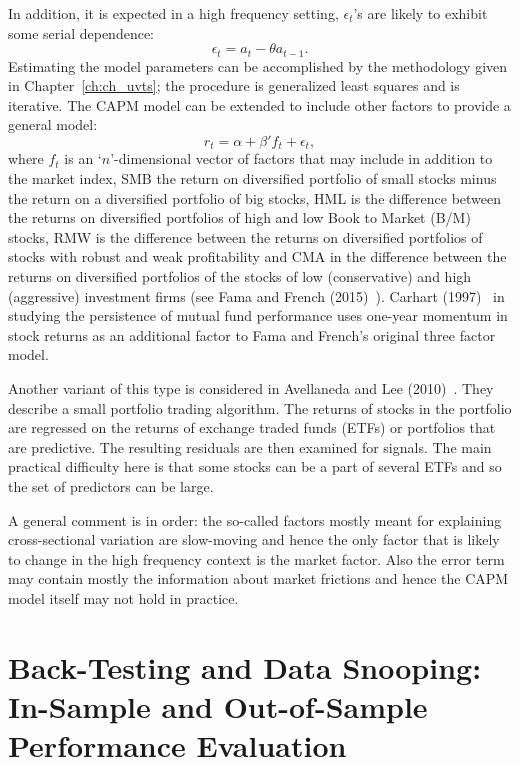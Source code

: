 In addition, it is expected in a high frequency setting, $\epsilon_t$'s are likely to exhibit some serial dependence:
	\begin{equation} \label{eqn:et}
	\epsilon_t = a_t - \theta a_{t-1}.
	\end{equation}
Estimating the model parameters can be accomplished by the methodology given in Chapter~\ref{ch:ch_uvts}; the procedure is generalized least squares and is iterative. The CAPM model can be extended to include other factors to provide a general model:
	\begin{equation} \label{eqn:rtalpha}
	r_t = \alpha + \beta'f_{t} + \epsilon_t,
	\end{equation}
where $f_t$ is an `$n$'-dimensional vector of factors that may include in addition to the market index, SMB the return on diversified portfolio of small stocks minus the return on a diversified portfolio of big stocks, HML is the difference between the returns on diversified portfolios of high and low Book to Market (B/M) stocks, RMW is the difference between the returns on diversified portfolios of stocks with robust and weak profitability and CMA in the difference between the returns on diversified portfolios of the stocks of low (conservative) and high (aggressive) investment firms (see Fama and French (2015)~\cite{fama2015}). Carhart (1997)~\cite{carhart1997persistence} in studying the persistence of mutual fund performance uses one-year momentum in stock returns as an additional factor to Fama and French's original three factor model.


Another variant of this type is considered in Avellaneda and Lee (2010)~\cite{avellee}. They describe a small portfolio trading algorithm. The returns of stocks in the portfolio are regressed on the returns of exchange traded funds (ETFs) or portfolios that are predictive. The resulting residuals are then examined for signals. The main practical difficulty here is that some stocks can be a part of several ETFs and so the set of predictors can be large. 


A general comment is in order: the so-called factors mostly meant for explaining cross-sectional variation are slow-moving and hence the only factor that is likely to change in the high frequency context is the market factor. Also the error term may contain mostly the information about market frictions and hence the CAPM model itself may not hold in practice.



\section{Back-Testing and Data Snooping:  In-Sample and Out-of-Sample Performance Evaluation}


